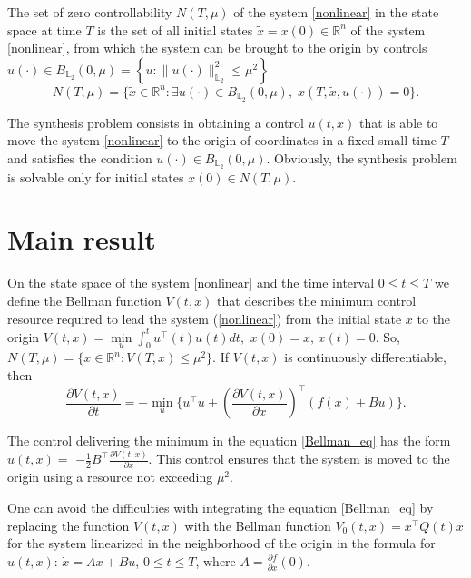 \documentclass[12pt]{llncs}
\begin{document}
\begin{definition}
The set of zero controllability $ N(T,\mu) $ of the system \eqref{nonlinear} in the state space at time $ T $ is the set of all initial states $ \widetilde{x}=x(0) \in \mathbb{R}^n $ of the system \eqref{nonlinear}, from which the system can be brought to the origin by controls $ u(\cdot) \in B_{\mathbb{L}_2}(0,\mu)  =\left\lbrace u:\lVert u(\cdot)\rVert^2_{\mathbb{L}_2} \leq \mu^2\right\rbrace  $ 
	\begin{equation*}
		N(T,\mu)=\{\widetilde{x}\in \mathbb{R}^n:\exists u(\cdot)\in B_{\mathbb{L}_2}(0,\mu),\; x( T,\widetilde{x},u(\cdot)) = 0\}.
	\end{equation*}
\end{definition}

The synthesis problem consists in obtaining a control $u(t,x) $ that is able to move the system \eqref{nonlinear} to the origin of coordinates in a fixed small time $ T $ and satisfies the condition $ u(\cdot) \in B_{\mathbb{L}_2}(0,\mu) $. Obviously, the synthesis problem is solvable only for initial states $x(0) \in N(T,\mu)$.

\section{Main result}

On the state space of the system \eqref{nonlinear} and the time interval $ 0 \leq t \leq T $ we define the Bellman function $ V(t,x) $ that describes the minimum control resource required to lead the system (\ref{nonlinear}) from the initial state $x$ to the origin  $ V(t,x) = \min\limits_{u} \int_{0}^{t} u^{\top}(t) u(t)dt, \, \,x(0)=x,\,x(t)=0 $.
So,	$N(T,\mu)  = \{x \in \mathbb{R}^n: V(T,x) \leq \mu^2\}$.  If $V(t,x)$ is continuously differentiable, then
\begin{equation}\label{Bellman_eq}
	\frac{\partial V(t,x)}{\partial t} = -\min\limits_{u} \{u^{\top} u + \left(\frac{\partial V(t,x)}{\partial x}\right)^{\top} \left(f(x)+B u\right) \}.
\end{equation}

The control delivering the minimum in the equation \eqref{Bellman_eq} has the form $
u(t,x) =$ $-\frac{1}{2} B^{\top}\frac{\partial V(t,x)}{\partial x}.$ This control ensures that the system is moved to the origin using a resource not exceeding $\mu^2$. 

One can avoid the difficulties  with integrating the equation \eqref{Bellman_eq} by replacing the function $V(t,x)$ with the Bellman function $V_0(t,x) = x^\top Q(t)x$ for the system linearized in the neigh\-bor\-hood of the origin in the formula for $u(t,x)$: $ \dot{x} = A x + B u$,  $ 0 \leq t \leq  T$, where $ A = \frac{\partial f}{\partial x}(0) $.
\end{document}
